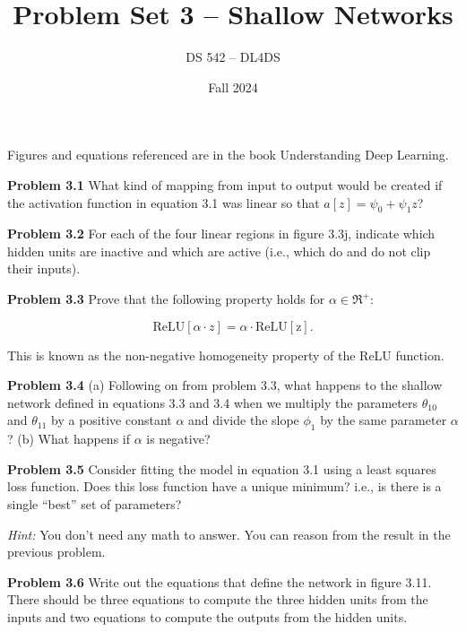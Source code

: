 \documentclass[11pt, oneside]{article}   	%
\title{Problem Set 3 -- Shallow Networks}
\author{DS 542 -- DL4DS}
\date{Fall 2024}
\begin{document}
\maketitle

Figures and equations referenced are in the book Understanding Deep Learning.

\textbf{Problem 3.1} 
What kind of mapping from input to output would be created if the activation
function in equation 3.1 was linear so that \(a[z] = \psi_0 + \psi_1 z\)?

\vspace{1cm}

\textbf{Problem 3.2} For each of the four linear regions in figure 3.3j, 
indicate which hidden units are inactive and which are active (i.e., which do
and do not clip their inputs).

\vspace{1cm}

\textbf{Problem 3.3} Prove that the following property holds for
\(\alpha \in \Re^+\):

\[\mathrm{ReLU}[\alpha \cdot z] = \alpha \cdot \mathrm{ReLU[z]}.\]

This is known as the non-negative homogeneity property of the ReLU function.

\vspace{1cm}

\textbf{Problem 3.4} (a) Following on from problem 3.3, what happens to the
shallow network defined in equations 3.3 and 3.4 when we multiply the
parameters \(\theta_{10}\) and \(\theta_{11}\) by a positive constant
\(\alpha\) and divide the slope \(\phi_1\) by the same parameter
\(\alpha\)? (b) What happens if \(\alpha\) is negative?

\vspace{1cm}

\textbf{Problem 3.5} Consider fitting the model in equation 3.1 using a
least squares loss function. Does this loss function have a unique minimum?
i.e., is there is a single “best” set of parameters?

\textit{Hint:} You don't need any math to answer. You can reason from the 
result in the previous problem.

\vspace{1cm}

\textbf{Problem 3.6} Write out the equations that define the network in
figure 3.11. There should be three equations to compute the three hidden
units from the inputs and two equations to compute the outputs from the
hidden units.
\end{document}
